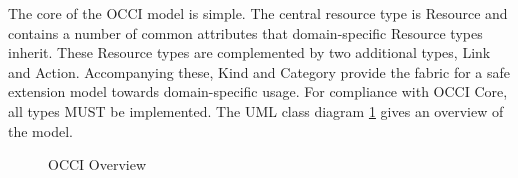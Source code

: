 \documentclass[10pt,a4paper]{article}
\begin{document}
The core of the OCCI model is simple. The central resource type is
Resource and contains a number of common attributes that
domain-specific Resource types inherit. These Resource types are
complemented by two additional types, Link and Action. Accompanying
these, Kind and Category provide the fabric for a safe extension model
towards domain-specific usage. For compliance with OCCI Core, all
types MUST be implemented. The UML class diagram \ref{fig:occi_core}
gives an overview of the model.

\clearpage
\begin{figure}[!h]
{\centering {} \par}
\caption{OCCI Overview}
\label{fig:occi_core}
\end{figure}
\end{document}
